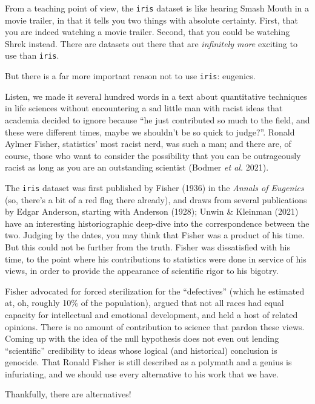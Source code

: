 \documentclass[
  letterpaper,
]{scrbook}
\begin{document}
From a teaching point of view, the \texttt{iris} dataset is like hearing
Smash Mouth in a movie trailer, in that it tells you two things with
absolute certainty. First, that you are indeed watching a movie trailer.
Second, that you could be watching Shrek instead. There are datasets out
there that are \emph{infinitely more} exciting to use than
\texttt{iris}.

But there is a far more important reason not to use \texttt{iris}:
eugenics.

Listen, we made it several hundred words in a text about quantitative
techniques in life sciences without encountering a sad little man with
racist ideas that academia decided to ignore because ``he just
contributed so much to the field, and these were different times, maybe
we shouldn't be so quick to judge?''. Ronald Aylmer Fisher, statistics'
most racist nerd, was such a man; and there are, of course, those who
want to consider the possibility that you can be outrageously racist as
long as you are an outstanding scientist (Bodmer \emph{et al.} 2021).

The \texttt{iris} dataset was first published by Fisher (1936) in the
\emph{Annals of Eugenics} (so, there's a bit of a red flag there
already), and draws from several publications by Edgar Anderson,
starting with Anderson (1928); Unwin \& Kleinman (2021) have an
interesting historiographic deep-dive into the correspondence between
the two. Judging by the dates, you may think that Fisher was a product
of his time. But this could not be further from the truth. Fisher was
dissatisfied with his time, to the point where his contributions to
statistics were done in service of his views, in order to provide the
appearance of scientific rigor to his bigotry.

Fisher advocated for forced sterilization for the ``defectives'' (which
he estimated at, oh, roughly 10\% of the population), argued that not
all races had equal capacity for intellectual and emotional development,
and held a host of related opinions. There is no amount of contribution
to science that pardon these views. Coming up with the idea of the null
hypothesis does not even out lending ``scientific'' credibility to ideas
whose logical (and historical) conclusion is genocide. That Ronald
Fisher is still described as a polymath and a genius is infuriating, and
we should use every alternative to his work that we have.

Thankfully, there are alternatives!
\end{document}
